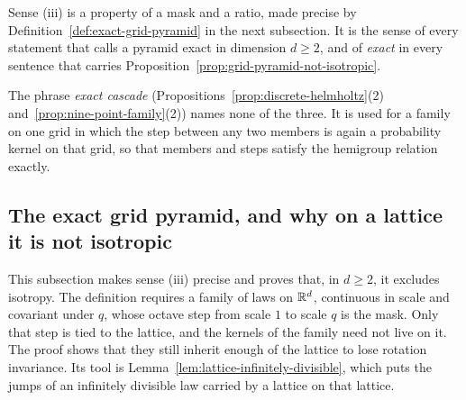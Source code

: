 Sense (iii) is a property of a mask and a ratio, made precise by
Definition~\ref{def:exact-grid-pyramid} in the next subsection. It is the sense of every statement
that calls a pyramid exact in dimension $d \ge 2$, and of \emph{exact} in every sentence that
carries Proposition~\ref{prop:grid-pyramid-not-isotropic}.

The phrase \emph{exact cascade} (Propositions~\ref{prop:discrete-helmholtz}(2)
and~\ref{prop:nine-point-family}(2)) names none of the three. It is used for a family on one grid
in which the step between any two members is again a probability kernel on that grid, so that
members and steps satisfy the hemigroup relation exactly.

\subsection{The exact grid pyramid, and why on a lattice it is not isotropic}
\label{sec:price-obstruction}

This subsection makes sense (iii) precise and proves that, in $d \ge 2$, it excludes isotropy. The
definition requires a family of laws on $\mathbb{R}^d$, continuous in scale and covariant under $q$, whose
octave step from scale $1$ to scale $q$ is the mask. Only that step is tied to the lattice, and the
kernels of the family need not live on it. The proof shows that they still inherit enough of the
lattice to lose rotation invariance. Its tool is Lemma~\ref{lem:lattice-infinitely-divisible},
which puts the jumps of an infinitely divisible law carried by a lattice on that lattice.

